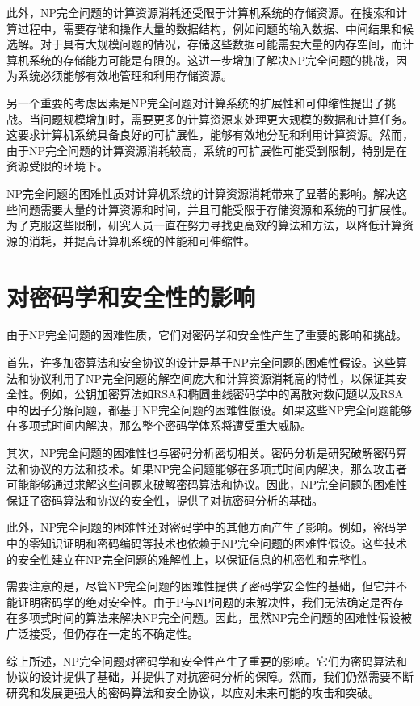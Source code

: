 \documentclass[UTF8,openany,zihao=5]{ctexbook}
\begin{document}
此外，NP完全问题的计算资源消耗还受限于计算机系统的存储资源。在搜索和计算过程中，需要存储和操作大量的数据结构，例如问题的输入数据、中间结果和候选解。对于具有大规模问题的情况，存储这些数据可能需要大量的内存空间，而计算机系统的存储能力可能是有限的。这进一步增加了解决NP完全问题的挑战，因为系统必须能够有效地管理和利用存储资源。

另一个重要的考虑因素是NP完全问题对计算系统的扩展性和可伸缩性提出了挑战。当问题规模增加时，需要更多的计算资源来处理更大规模的数据和计算任务。这要求计算机系统具备良好的可扩展性，能够有效地分配和利用计算资源。然而，由于NP完全问题的计算资源消耗较高，系统的可扩展性可能受到限制，特别是在资源受限的环境下。

NP完全问题的困难性质对计算机系统的计算资源消耗带来了显著的影响。解决这些问题需要大量的计算资源和时间，并且可能受限于存储资源和系统的可扩展性\cite{bi:AB}。为了克服这些限制，研究人员一直在努力寻找更高效的算法和方法，以降低计算资源的消耗，并提高计算机系统的性能和可伸缩性。

\section{对密码学和安全性的影响}
由于NP完全问题的困难性质，它们对密码学和安全性产生了重要的影响和挑战。

首先，许多加密算法和安全协议的设计是基于NP完全问题的困难性假设。这些算法和协议利用了NP完全问题的解空间庞大和计算资源消耗高的特性，以保证其安全性。例如，公钥加密算法如RSA和椭圆曲线密码学中的离散对数问题以及RSA中的因子分解问题，都基于NP完全问题的困难性假设。如果这些NP完全问题能够在多项式时间内解决，那么整个密码学体系将遭受重大威胁。

其次，NP完全问题的困难性也与密码分析密切相关。密码分析是研究破解密码算法和协议的方法和技术。如果NP完全问题能够在多项式时间内解决，那么攻击者可能能够通过求解这些问题来破解密码算法和协议。因此，NP完全问题的困难性保证了密码算法和协议的安全性，提供了对抗密码分析的基础。

此外，NP完全问题的困难性还对密码学中的其他方面产生了影响。例如，密码学中的零知识证明和密码编码等技术也依赖于NP完全问题的困难性假设。这些技术的安全性建立在NP完全问题的难解性上，以保证信息的机密性和完整性。

需要注意的是，尽管NP完全问题的困难性提供了密码学安全性的基础，但它并不能证明密码学的绝对安全性。由于P与NP问题的未解决性，我们无法确定是否存在多项式时间的算法来解决NP完全问题。因此，虽然NP完全问题的困难性假设被广泛接受，但仍存在一定的不确定性。

综上所述，NP完全问题对密码学和安全性产生了重要的影响。它们为密码算法和协议的设计提供了基础，并提供了对抗密码分析的保障。然而，我们仍然需要不断研究和发展更强大的密码算法和安全协议，以应对未来可能的攻击和突破。
\end{document}
